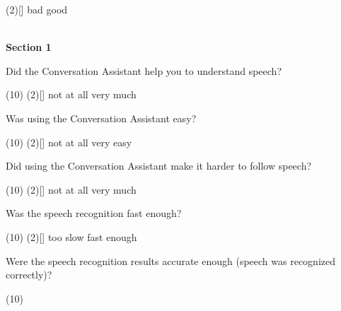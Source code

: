 \documentclass[english, 12pt, a4paper, pdftex, elec, utf8]{aaltothesis}
\begin{document}
{\begin{questionnaire}
\begin{tasks}[]
            \task*(2)[] bad
            \task[] good \\\\
        \end{tasks}
    \end{questionnaire}
    \noindent
    \hspace{0.35cm} \textbf{Section 1}  
    \begin{questionnaire}[resume]
        \item Did the Conversation Assistant help you to understand speech?
        \begin{tasks}[](10)
            \task*(2)[] not at all
            \task[] very much
        \end{tasks}
        \item Was using the Conversation Assistant easy?
        \begin{tasks}[](10)
            \task*(2)[] not at all
            \task[] very easy
        \end{tasks}
        \item Did using the Conversation Assistant make it harder to follow speech?
        \begin{tasks}[](10)
            \task*(2)[] not at all
            \task[] very much
        \end{tasks}
        \item Was the speech recognition fast enough?
        \begin{tasks}[](10)
            \task*(2)[] too slow
            \task[] fast enough
        \end{tasks}
        \item Were the speech recognition results accurate enough (speech was recognized correctly)?
        \begin{tasks}[](10)

\end{tasks}
\end{questionnaire}}
\end{document}
